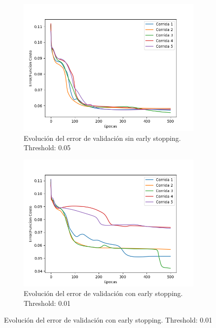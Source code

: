 \begin{figure}[!htbp]
\centering
\begin{subfigure}{.5\textwidth}
  \centering
  \includegraphics[width=1\linewidth]{graficos/ej2/early_stopping_validacion_0_05.png}
  \caption{Evolución del error de validación sin early stopping. Threshold: 0.05}
  \label{fig:sub1}
\end{subfigure}%
\begin{subfigure}{.5\textwidth}
  \centering
  \includegraphics[width=1\linewidth]{graficos/ej2/early_stopping_validacion_0_01.png}
  \caption{Evolución del error de validación con early stopping. Threshold: 0.01}
  \label{fig:sub2}
\end{subfigure}
\end{figure}

